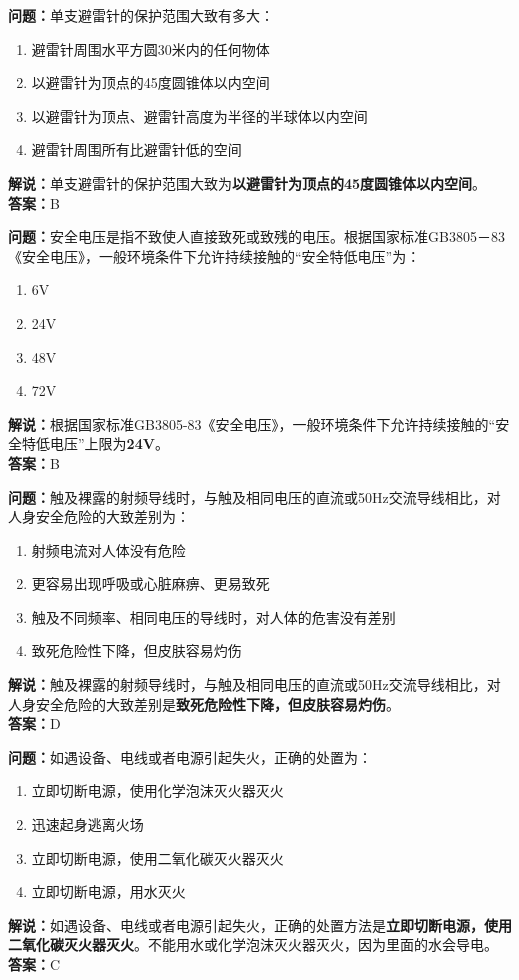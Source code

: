\textbf{问题：}单支避雷针的保护范围大致有多大：

\begin{enumerate}[label=\Alph*), leftmargin=1.5cm]
	\item 避雷针周围水平方圆30米内的任何物体
	\item 以避雷针为顶点的45度圆锥体以内空间
	\item 以避雷针为顶点、避雷针高度为半径的半球体以内空间
	\item 避雷针周围所有比避雷针低的空间
\end{enumerate}

\textbf{解说：}单支避雷针的保护范围大致为\textbf{以避雷针为顶点的45度圆锥体以内空间}。\\\textbf{答案：}B%



\textbf{问题：}安全电压是指不致使人直接致死或致残的电压。根据国家标准GB3805－83《安全电压》，一般环境条件下允许持续接触的“安全特低电压”为：

\begin{enumerate}[label=\Alph*), leftmargin=1.5cm]
	\item 6V
	\item 24V
	\item 48V
	\item 72V
\end{enumerate}

\textbf{解说：}根据国家标准GB3805-83《安全电压》，一般环境条件下允许持续接触的“安全特低电压”上限为\textbf{24V}。\\\textbf{答案：}B%



\textbf{问题：}触及裸露的射频导线时，与触及相同电压的直流或50Hz交流导线相比，对人身安全危险的大致差别为：
\begin{enumerate}[label=\Alph*), leftmargin=1.5cm]
	\item 射频电流对人体没有危险
	\item 更容易出现呼吸或心脏麻痹、更易致死
	\item 触及不同频率、相同电压的导线时，对人体的危害没有差别
	\item 致死危险性下降，但皮肤容易灼伤
\end{enumerate}
\textbf{解说：}触及裸露的射频导线时，与触及相同电压的直流或50Hz交流导线相比，对人身安全危险的大致差别是\textbf{致死危险性下降，但皮肤容易灼伤}。\\\textbf{答案：}D


\textbf{问题：}如遇设备、电线或者电源引起失火，正确的处置为：
\begin{enumerate}[label=\Alph*), leftmargin=1.5cm]
	\item 立即切断电源，使用化学泡沫灭火器灭火
	\item 迅速起身逃离火场
	\item 立即切断电源，使用二氧化碳灭火器灭火
	\item 立即切断电源，用水灭火
\end{enumerate}
\textbf{解说：}如遇设备、电线或者电源引起失火，正确的处置方法是\textbf{立即切断电源，使用二氧化碳灭火器灭火}。不能用水或化学泡沫灭火器灭火，因为里面的水会导电。\\\textbf{答案：}C


